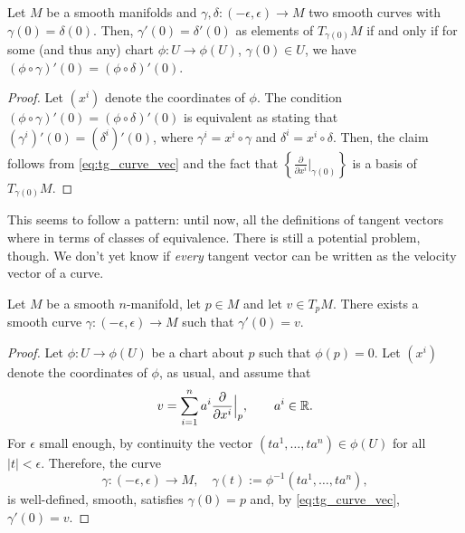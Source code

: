 \begin{lem}\label{lem:equiv_tg_curves}
    Let $M$ be a smooth manifolds and $\gamma, \delta : (-\epsilon, \epsilon) \to M$ two smooth curves with $\gamma(0) = \delta(0)$. Then, $\gamma'(0) = \delta'(0)$ as elements of $T_{\gamma(0)}M$ if and only if for some (and thus any) chart $\phi:U\to\phi(U)$, $\gamma(0)\in U$, we have $(\phi\circ \gamma)'(0) = (\phi\circ\delta)'(0)$.
\end{lem}
\begin{proof}
    Let $(x^i)$ denote the coordinates of $\phi$. The condition $(\phi\circ \gamma)'(0) = (\phi\circ\delta)'(0)$ is equivalent as stating that $(\gamma^i)'(0) = (\delta^i)'(0)$, where $\gamma^i = x^i\circ\gamma$ and $\delta^i=x^i\circ\delta$. Then, the claim follows from \eqref{eq:tg_curve_vec} and the fact that $\left\{\frac{\partial}{\partial x^i}\big|_{\gamma(0)}\right\}$ is a basis of $T_{\gamma(0)}M$.
\end{proof}

This seems to follow a pattern: until now, all the definitions of tangent vectors where in terms of classes of equivalence.
There is still a potential problem, though. We don't yet know if \emph{every} tangent vector can be written as the velocity vector of a curve.

\begin{thm}
    Let $M$ be a smooth $n$-manifold, let $p\in M$ and let $v\in T_pM$.
    There exists a smooth curve $\gamma: (-\epsilon,\epsilon) \to M$ such that $\gamma'(0) = v$.
\end{thm}
\begin{proof}
    Let $\phi:U\to\phi(U)$ be a chart about $p$ such that $\phi(p)=0$.
    Let $(x^i)$ denote the coordinates of $\phi$, as usual, and assume that
    \begin{equation}
        v = \sum_{i=1}^n a^i \frac{\partial}{\partial x^i}\Big|_p, \qquad a^i \in\mathbb{R}.
    \end{equation}
    For $\epsilon$ small enough, by continuity the vector $(ta^1, \ldots, ta^n) \in \phi(U)$ for all $|t|<\epsilon$. Therefore, the curve
    \begin{equation}
        \gamma: (-\epsilon, \epsilon) \to M, \quad \gamma(t):=\phi^{-1}(ta^1, \ldots, ta^n),
    \end{equation}
    is well-defined, smooth, satisfies $\gamma(0) = p$ and, by \eqref{eq:tg_curve_vec}, $\gamma'(0) = v$.
\end{proof}


